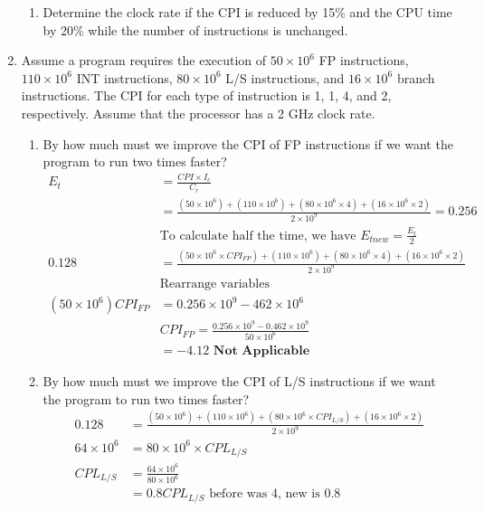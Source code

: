 \documentclass[10pt]{article}
\begin{document}
\begin{enumerate}
\begin{enumerate}
        \item
        Determine the clock rate if the CPI is reduced by 15\% and the CPU time by 20\% while the number of instructions is unchanged.
    \end{enumerate}
    \item Assume a program requires the execution of $50 \times 10^6$ FP instructions, $110 \times 10^6$ INT instructions, $80 \times 10^6$ L/S instructions, and $16 \times 10^6$ branch instructions. The CPI for each type of instruction is 1, 1, 4, and 2, respectively. Assume that the processor has a 2 GHz clock rate.
    \begin{enumerate}
        \item 
        By how much must we improve the CPI of FP instructions if we want the program to run two times faster?
        \begin{align*}
            E_t &= \frac{CPI \times I_c}{C_r}\\
            &= \frac{(50 \times 10^6) + (110 \times 10^6) + (80 \times 10^6 \times 4) + (16 \times 10^6 \times 2)}{2 \times 10^9} = 0.256\\
            &\text{To calculate half the time, we have $E_{tnew} = \frac{E_t}{2}$}\\
            0.128 &= \frac{(50 \times 10^6 \times CPI_{FP}) + (110 \times 10^6) + (80 \times 10^6 \times 4) + (16 \times 10^6 \times 2)}{2 \times 10^9}\\
            &\text{Rearrange variables}\\
            (50 \times 10^6) CPI_{FP} &= 0.256 \times 10^9 - 462 \times 10^6\\
            &CPI_{FP}= \frac{0.256 \times 10^9 - 0.462 \times 10^9}{50 \times 10^6}\\
            &= -4.12 \textbf{ Not Applicable}
        \end{align*}
        \item
        By how much must we improve the CPI of L/S instructions if we want the program to run two times faster?
        \begin{align*}
            0.128 &= \frac{(50 \times 10^6) + (110 \times 10^6) + (80 \times 10^6 \times CPI_{L/S}) + (16 \times 10^6 \times 2)}{2 \times 10^9}\\
            64 \times 10^6 &= 80 \times 10^6 \times CPL_{L/S}\\
            CPL_{L/S} &= \frac{64 \times 10^6}{80 \times 10^6}\\
            &= 0.8
            \text{$CPL_{L/S}$ before was 4, new is 0.8}\\

\end{align*}
\end{enumerate}
\end{enumerate}
\end{document}
